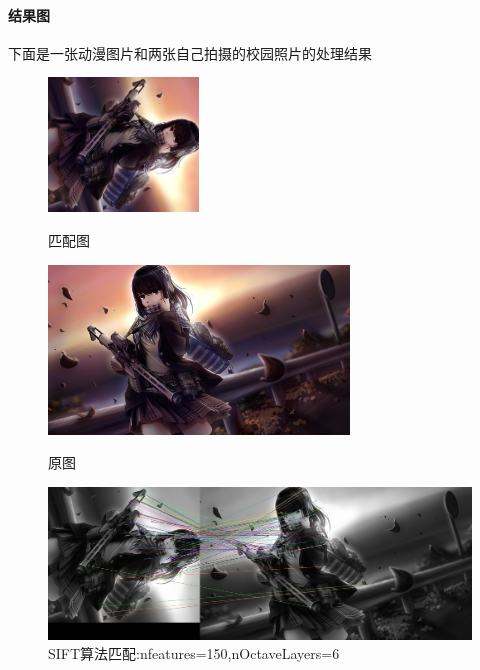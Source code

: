 \documentclass{article}
\begin{document}
        \paragraph{结果图}下面是一张动漫图片和两张自己拍摄的校园照片的处理结果
        \begin{figure}[htbp]
                \begin{minipage}[t]{0.5\linewidth}
                \includegraphics[width=4cm]{test1.png}
                \caption{匹配图}\label{1-a}
                \end{minipage}
                \begin{minipage}[t]{0.5\linewidth}
                \includegraphics[width=8cm]{test2.png}
                \caption{原图}\label{1-b}
                \end{minipage}
                \begin{minipage}[t]{1\linewidth}\centering
                \includegraphics[width=12cm]{sift_matches.jpg}
                \caption{SIFT算法匹配:nfeatures=150,nOctaveLayers=6}\label{1-c}
                \end{minipage}
        \end{figure}
\end{document}
